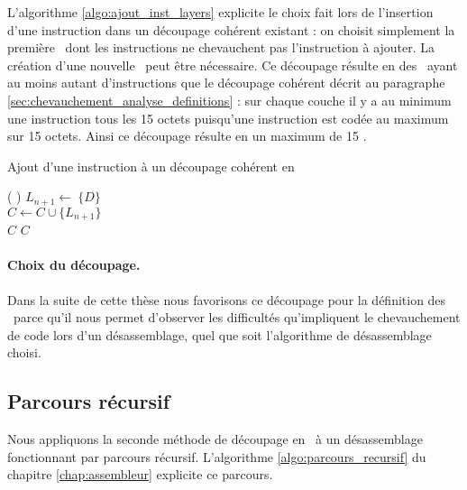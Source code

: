 
L'algorithme \ref{algo:ajout_inst_layers} explicite le choix fait lors de l'insertion d'une instruction dans un découpage cohérent existant : on choisit simplement la première \layer\ dont les instructions ne chevauchent pas l'instruction à ajouter. La création d'une nouvelle \layer\ peut être nécessaire. 
Ce découpage résulte en des \layers\ ayant au moins autant d'instructions que le découpage cohérent décrit au paragraphe \ref{sec:chevauchement_analyse_definitions} : sur chaque couche il y a au minimum une instruction tous les 15 octets puisqu'une instruction est codée au maximum sur 15 octets. Ainsi ce découpage résulte en un maximum de 15 \layers.

\begin{algorithm}[H] %
\caption{Ajout d'une instruction à un découpage cohérent en \layers}
\SetAlgoLined
{}
\Fn(
){}{
 {
  $L_{n+1}\leftarrow\ \{D\}$ \\
  $C\leftarrow C\cup\{L_{n+1}\}$ \\
  \Return $C$
}
{
  \Return $C$
}
}
\label{algo:ajout_inst_layers}
\end{algorithm}


\paragraph{Choix du découpage.}
Dans la suite de cette thèse nous favorisons ce découpage pour la définition des \layers\ parce qu'il nous permet d'observer les difficultés qu'impliquent le chevauchement de code lors d'un désassemblage, quel que soit l'algorithme de désassemblage choisi.

\subsection{Parcours récursif\label{sec:layers_decoupage_recursif}}
Nous appliquons la seconde méthode de découpage en \layers\ à un désassemblage fonctionnant par parcours récursif. L'algorithme \ref{algo:parcours_recursif} du chapitre \ref{chap:assembleur} explicite ce parcours.

